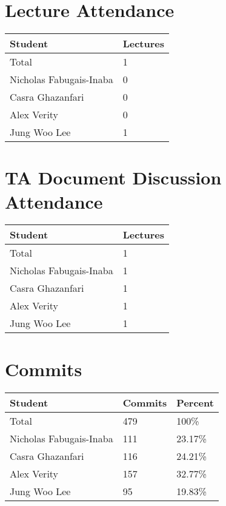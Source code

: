 \documentclass{article}
\begin{document}
\section{Lecture Attendance}

\begin{table}[H]
\centering
\begin{tabular}{ll}
\toprule
\textbf{Student} & \textbf{Lectures}\\
\midrule
Total & 1\\
Nicholas Fabugais-Inaba & 0\\
Casra Ghazanfari & 0\\
Alex Verity & 0\\
Jung Woo Lee & 1\\
\bottomrule
\end{tabular}
\end{table}

\section{TA Document Discussion Attendance}

\begin{table}[H]
\centering
\begin{tabular}{ll}
\toprule
\textbf{Student} & \textbf{Lectures}\\
\midrule
Total & 1\\
Nicholas Fabugais-Inaba & 1\\
Casra Ghazanfari & 1\\
Alex Verity & 1\\
Jung Woo Lee & 1\\
\bottomrule
\end{tabular}
\end{table}

\section{Commits}

\begin{table}[H]
\centering
\begin{tabular}{lll}
\toprule
\textbf{Student} & \textbf{Commits} & \textbf{Percent}\\
\midrule
Total & 479 & 100\% \\
Nicholas Fabugais-Inaba & 111 & 23.17\% \\
Casra Ghazanfari & 116 & 24.21\% \\
Alex Verity & 157 & 32.77\% \\
Jung Woo Lee & 95 & 19.83\% \\
\bottomrule
\end{tabular}
\end{table}
\end{document}
